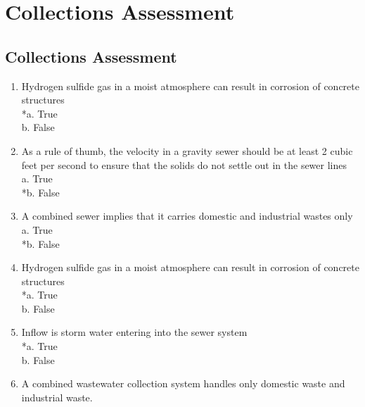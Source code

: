 
\chapter{Collections Assessment}

\section*{Collections Assessment}
\begin{enumerate}

\item  Hydrogen sulfide gas in a moist atmosphere can result in corrosion of concrete structures \\

*a. True \\
b. False \\

\item  As a rule of thumb, the velocity in a gravity sewer should be at least 2 cubic feet per second to ensure that the solids do not settle out in the sewer lines\\

a. True \\
*b. False \\

\item  A combined sewer implies that it carries domestic and industrial wastes only \\

a. True \\
*b. False \\

\item  Hydrogen sulfide gas in a moist atmosphere can result in corrosion of concrete structures \\

*a. True \\
b. False \\

\item  Inflow is storm water entering into the sewer system \\

*a. True \\
b. False \\

\item  A combined wastewater collection system handles only domestic waste and industrial waste. \\


\end{enumerate}
